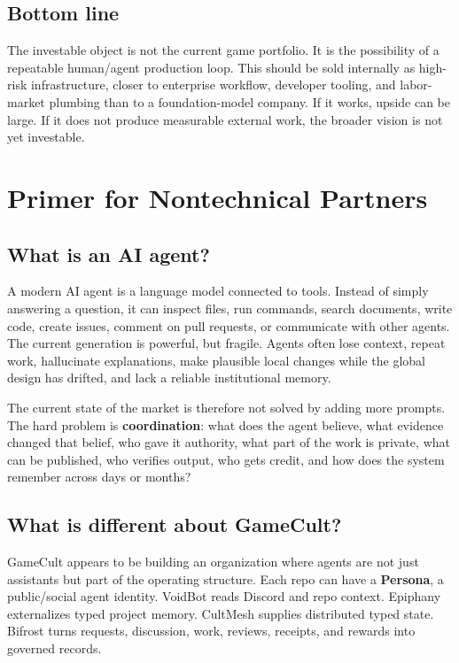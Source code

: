 \documentclass[11pt,oneside]{report}
\newcommand{\term}[1]{\textbf{#1}}
\begin{document}
\section*{Bottom line}

The investable object is not the current game portfolio. It is the possibility of a repeatable human/agent production loop. This should be sold internally as high-risk infrastructure, closer to enterprise workflow, developer tooling, and labor-market plumbing than to a foundation-model company. If it works, upside can be large. If it does not produce measurable external work, the broader vision is not yet investable.

\chapter{Primer for Nontechnical Partners}

\section{What is an AI agent?}

A modern AI agent is a language model connected to tools. Instead of simply answering a question, it can inspect files, run commands, search documents, write code, create issues, comment on pull requests, or communicate with other agents. The current generation is powerful, but fragile. Agents often lose context, repeat work, hallucinate explanations, make plausible local changes while the global design has drifted, and lack a reliable institutional memory.

The current state of the market is therefore not solved by adding more prompts. The hard problem is \term{coordination}: what does the agent believe, what evidence changed that belief, who gave it authority, what part of the work is private, what can be published, who verifies output, who gets credit, and how does the system remember across days or months?

\section{What is different about GameCult?}

GameCult appears to be building an organization where agents are not just assistants but part of the operating structure. Each repo can have a \term{Persona}, a public/social agent identity. VoidBot reads Discord and repo context. Epiphany externalizes typed project memory. CultMesh supplies distributed typed state. Bifrost turns requests, discussion, work, reviews, receipts, and rewards into governed records.
\end{document}
